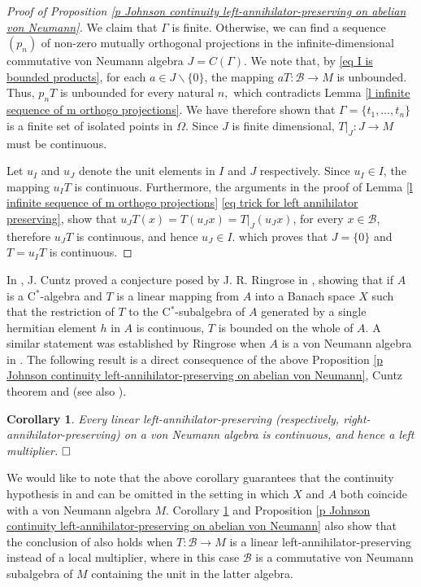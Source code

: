 \documentclass[11pt]{amsart}
\newtheorem{corollary}[theorem]{Corollary}
\begin{document}
\begin{proof}[Proof of Proposition \ref{p Johnson continuity left-annihilator-preserving on abelian von Neumann}]
We claim that $\Gamma$ is finite. Otherwise, we can find a sequence $(p_n)$ of non-zero mutually orthogonal projections in the infinite-dimensional commutative von Neumann algebra $J= C(\Gamma).$ We note that, by \eqref{eq I is bounded products}, for each $a\in J\backslash\{0\}$, the mapping $a T : \mathcal{B} \to M$ is unbounded. Thus, $p_n T$ is unbounded for every natural $n,$ which contradicts Lemma \ref{l infinite sequence of m orthogo projections}. We have therefore shown that $\Gamma = \{t_1,\ldots,t_n\}$ is a finite set of isolated points in $\Omega$. Since $J$ is finite dimensional, $T|_{J} : J \to M$ must be continuous.\smallskip

Let $u_{I}$ and $u_{J}$ denote the unit elements in $I$ and $J$ respectively. Since $u_{I}\in I$, the mapping $u_I T $ is continuous. Furthermore, the arguments in the proof of Lemma \ref{l infinite sequence of m orthogo projections} \ref{eq trick for left annihilator preserving}, show that $u_{J} T(x) = T (u_{J} x) = T|_{J} (u_{J} x)$, for every $x\in \mathcal{B}$, therefore $u_{J} T$ is continuous, and hence $u_J\in I$. which proves that $J=\{0\}$ and $T =  u_{I} T$ is continuous.
\end{proof}

In \cite[Theorem 1.3]{Cuntz}, J. Cuntz proved a conjecture posed by J. R. Ringrose in \cite{Ringrose74}, showing that if $A$ is a C$^*$-algebra and $T$ is a linear mapping from $A$ into a Banach space $X$ such that the restriction of $T$ to the C$^*$-subalgebra of $A$ generated by a single hermitian element $h$ in $A$ is continuous, $T$ is bounded on the whole of $A$. A similar statement was established by Ringrose when $A$ is a von Neumann algebra in \cite{Ringrose74}. The following result is a direct consequence of the above Proposition \ref{p Johnson continuity left-annihilator-preserving on abelian von Neumann}, Cuntz theorem and \cite[Theorem 2.8]{LiPan} (see also \cite[Lemma 2.10]{AyuKudPe2014}).

\begin{corollary}\label{c prop automatic cont left-annihilator-preserving on  von Neumann} Every linear left-annihilator-preserving (respectively, \emph{right-annihilator-preserving}) on a von Neumann algebra is continuous, and hence a left multiplier. $\hfill\Box$
\end{corollary}

We would like to note that the above corollary guarantees that the continuity hypothesis in \cite[Theorem 2.8]{LiPan} and \cite[Lemma 2.10]{AyuKudPe2014} can be omitted in the setting in which $X$ and $A$ both coincide with a von Neumann algebra $M$. Corollary \ref{c prop automatic cont left-annihilator-preserving on  von Neumann} and Proposition \ref{p Johnson continuity left-annihilator-preserving on abelian von Neumann} also show that the conclusion of \cite[Proposition 7.2]{John01} also holds when $T: \mathcal{B}\to M$ is a linear left-annihilator-preserving instead of a local multiplier, where in this case $\mathcal{B}$ is a commutative von Neumann subalgebra of $M$ containing the unit in the latter algebra.\smallskip
\end{document}
